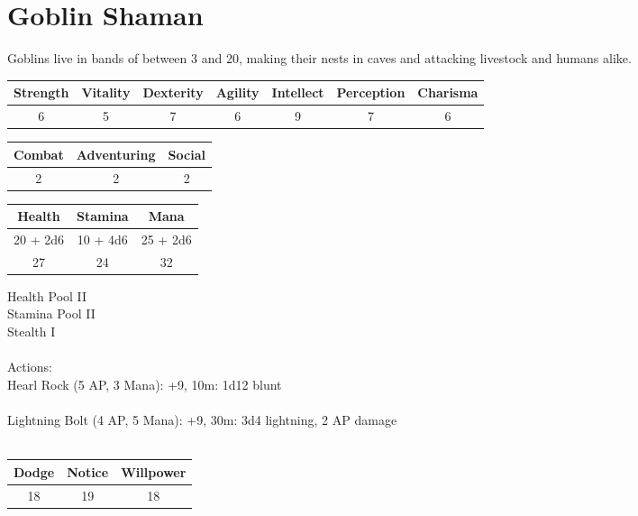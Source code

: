 \section{Goblin Shaman}

Goblins live in bands of between 3 and 20, making their nests in caves and attacking livestock and humans alike.

\begin{minipage}[H]{1\textwidth}
	\centering
	\begin{tabular}[c]{|c | c | c | c | c | c | c|}
		\hline
		Strength & Vitality & Dexterity & Agility & Intellect & Perception & Charisma\\
		\hline
		6 & 5 & 7 & 6 & 9 & 7 & 6\\
		\hline
	\end{tabular}
\end{minipage}
\bigbreak
\begin{minipage}[H]{1\textwidth}
	\centering
	\begin{tabular}[c]{|c | c | c|}
		\hline
		Combat & Adventuring & Social\\
		\hline
		2 & 2 & 2\\
		\hline
	\end{tabular}
\end{minipage}
\bigbreak
\begin{minipage}[H]{1\textwidth}
	\centering
	\begin{tabular}[c]{|c | c | c|}
		\hline
		Health & Stamina & Mana\\
		\hline
		20 + 2d6 & 10 + 4d6 & 25 + 2d6\\
		27 & 24 & 32\\
		\hline
	\end{tabular}
\end{minipage}
\noindent
Health Pool II\\
Stamina Pool II\\
Stealth I\\
\\
Actions:\\
Hearl Rock (5 AP, 3 Mana): +9, 10m: 1d12 blunt\\
\\
Lightning Bolt (4 AP, 5 Mana): +9, 30m: 3d4 lightning, 2 AP damage\\
\\
\begin{minipage}[H]{1\textwidth}
	\centering
	\begin{tabular}[c]{|c | c | c|}
		\hline
		Dodge & Notice & Willpower\\
		\hline
		18 & 19 & 18\\
		\hline
	\end{tabular}
\end{minipage}
